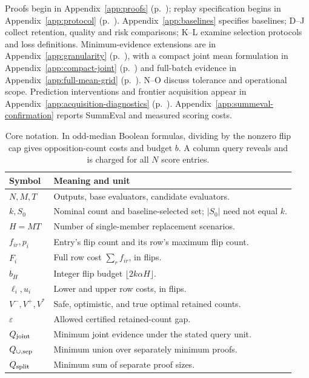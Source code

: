\raggedbottom
{}\vspace{6pt}
\noindent Proofs begin in Appendix~\ref{app:proofs} (p.~\pageref{app:proofs}); replay specification begins in Appendix~\ref{app:protocol} (p.~\pageref{app:protocol}). Appendix~\ref{app:baselines} specifies baselines; D--J collect retention, quality and risk comparisons; K--L examine selection protocols and loss definitions. Minimum-evidence extensions are in Appendix~\ref{app:granularity} (p.~\pageref{app:granularity}), with a compact joint mean formulation in Appendix~\ref{app:compact-joint} (p.~\pageref{app:compact-joint}) and full-batch evidence in Appendix~\ref{app:full-mean-grid} (p.~\pageref{app:full-mean-grid}). N--O discuss tolerance and operational scope. Prediction interventions and frontier acquisition appear in Appendix~\ref{app:acquisition-diagnostics} (p.~\pageref{app:acquisition-diagnostics}). Appendix~\ref{app:summeval-confirmation} reports SummEval and measured scoring costs.
\begin{table}[!h]
\centering\small
\begin{tabular}{@{}p{}p{}@{}}
\toprule
Symbol & Meaning and unit\\
\midrule
$N,M,T$ & Outputs, base evaluators, candidate evaluators.\\
$k,S_0$ & Nominal count and baseline-selected set; $|S_0|$ need not equal $k$.\\
$H=MT$ & Number of single-member replacement scenarios.\\
$f_{ir},p_i$ & Entry's flip count and its row's maximum flip count.\\
$F_i$ & Full row cost $\sum_r f_{ir}$, in flips.\\
$b_H$ & Integer flip budget $\lfloor2k\alpha H\rfloor$.\\
$\ell_i,u_i$ & Lower and upper row costs, in flips.\\
$V^-,V^+,V^*$ & Safe, optimistic, and true optimal retained counts.\\
$\varepsilon$ & Allowed certified retained-count gap.\\
$Q_{\rm joint}$ & Minimum joint evidence under the stated query unit.\\
$Q_{\cup,\rm sep}$ & Minimum union over separately minimum proofs.\\
$Q_{\rm split}$ & Minimum sum of separate proof sizes.\\
\bottomrule
\end{tabular}
\caption{Core notation. In odd-median Boolean formulas, dividing by the nonzero flip cap gives opposition-count costs and budget $b$. A column query reveals and is charged for all $N$ score entries.}
\label{tab:notation}
\end{table}


